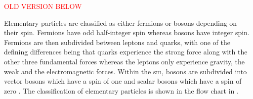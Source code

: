 \textcolor{red}{OLD VERSION BELOW}

Elementary particles are classified as either fermions or bosons depending on their spin. Fermions have odd half-integer spin whereas bosons have integer spin. Fermions are then subdivided between leptons and quarks, with one of the defining differences being that quarks experience the strong force along with the other three fundamental forces whereas the leptons only experience gravity, the weak and the electromagnetic forces. Within the \gls{sm}, bosons are subdivided into vector bosons which have a spin of one and scalar bosons which have a spin of zero \cite{Particles_and_Fundamental_Interactions:_An_Introduction_to_Particle_Physics}. The classification of elementary particles is shown in the flow chart in .

